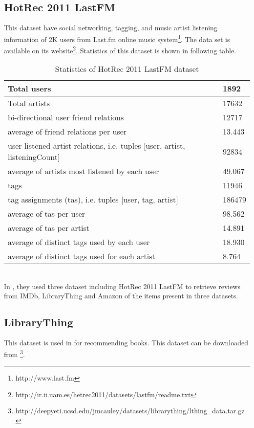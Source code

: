 \subsection{HotRec 2011 LastFM}
This dataset have social networking, tagging, and music artist listening information of 2K users from Last.fm online music system\footnote{ http://www.last.fm}. The data set is available on its website\footnote{http://ir.ii.uam.es/hetrec2011/datasets/lastfm/readme.txt}. Statistics of this dataset is shown in following table. 
\\
\begin{table}[!htbp] 
\centering
\footnotesize
\def\arraystretch{1.4}%
\centering
\begin{tabular}{|p{8cm}|p{2cm}|}
\hline
Total users & 1892 
\\
\hline 
Total artists & 17632  
\\
\hline 
bi-directional user friend relations & 12717 
\\
\hline 
average of friend relations per user & 13.443
\\
\hline
user-listened artist relations, i.e. tuples [user, artist, listeningCount] & 92834 
\\
\hline
average of artists most listened by each user & 49.067
\\
\hline 
tags & 11946
\\
\hline 
tag assignments (tas), i.e. tuples [user, tag, artist] & 186479 
\\
\hline 
average of tas per user & 98.562
\\
\hline 
average of tas per artist & 14.891
\\
\hline 
average of distinct tags used by each user & 18.930 
\\
\hline 
average of distinct tags used for each artist & 8.764 
\\
\hline
\end{tabular}

\caption{Statistics of HotRec 2011 LastFM dataset}
\label{table:12}
\end{table}
\\
In \cite{N13}, they used three dataset including  HotRec 2011 LastFM to retrieve reviews from IMDb, LibraryThing and Amazon of the items present in three datasets. 
\subsection{LibraryThing}
This dataset is used in \cite{N13} for recommending books. This dataset can be downloaded from \footnote{http://deepyeti.ucsd.edu/jmcauley/datasets/librarything/lthing\_data.tar.gz}.

